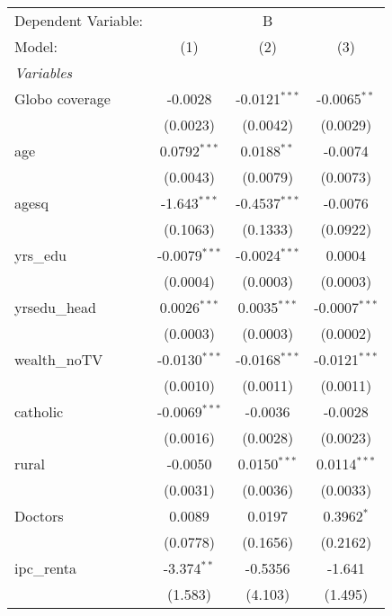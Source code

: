\begingroup
\centering
\begin{tabular}{lccc}
   \tabularnewline \midrule \midrule
   Dependent Variable: & \multicolumn{3}{c}{B}\\
   Model:         & (1)             & (2)             & (3)\\  
   \midrule
   \emph{Variables}\\
   Globo coverage & -0.0028         & -0.0121$^{***}$ & -0.0065$^{**}$\\   
                  & (0.0023)        & (0.0042)        & (0.0029)\\   
   age            & 0.0792$^{***}$  & 0.0188$^{**}$   & -0.0074\\   
                  & (0.0043)        & (0.0079)        & (0.0073)\\   
   agesq          & -1.643$^{***}$  & -0.4537$^{***}$ & -0.0076\\   
                  & (0.1063)        & (0.1333)        & (0.0922)\\   
   yrs\_edu       & -0.0079$^{***}$ & -0.0024$^{***}$ & 0.0004\\   
                  & (0.0004)        & (0.0003)        & (0.0003)\\   
   yrsedu\_head   & 0.0026$^{***}$  & 0.0035$^{***}$  & -0.0007$^{***}$\\   
                  & (0.0003)        & (0.0003)        & (0.0002)\\   
   wealth\_noTV   & -0.0130$^{***}$ & -0.0168$^{***}$ & -0.0121$^{***}$\\   
                  & (0.0010)        & (0.0011)        & (0.0011)\\   
   catholic       & -0.0069$^{***}$ & -0.0036         & -0.0028\\   
                  & (0.0016)        & (0.0028)        & (0.0023)\\   
   rural          & -0.0050         & 0.0150$^{***}$  & 0.0114$^{***}$\\   
                  & (0.0031)        & (0.0036)        & (0.0033)\\   
   Doctors        & 0.0089          & 0.0197          & 0.3962$^{*}$\\   
                  & (0.0778)        & (0.1656)        & (0.2162)\\   
   ipc\_renta     & -3.374$^{**}$   & -0.5356         & -1.641\\   
                  & (1.583)         & (4.103)         & (1.495)\\   

\end{tabular}
